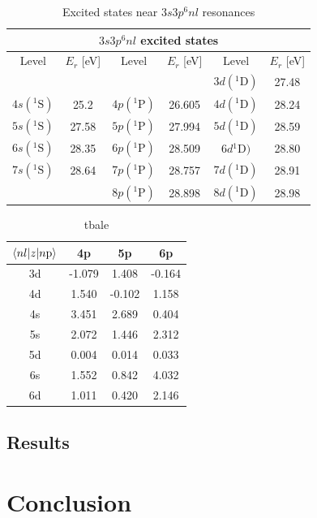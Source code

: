 \begin{table}[]
	\centering
	\begin{tabular}{|cc|cc|cc|}
		\hline \hline
		\multicolumn{6}{|c|}{$3s3p^6nl$ excited states}                                               \\ \hline
		Level        & $E_r$ {[}eV{]} & Level        & $E_r$ {[}eV{]} & Level        & $E_r$ {[}eV{]} \\ \hline
		&                &              &                & $3d({}^1\mathrm{D})$ & 27.48          \\
		$4s( {}^1\mathrm{S})$ & 25.2           & $4p({}^1\mathrm{P})$ & 26.605         & $4d({}^1\mathrm{D})$   & 28.24          \\
		$5s( {}^1\mathrm{S})$ & 27.58          & $5p({}^1\mathrm{P})$ & 27.994         & $5d({}^1\mathrm{D})$ & 28.59          \\
		$6s( {}^1\mathrm{S})$ & 28.35          & $6p({}^1\mathrm{P})$ & 28.509         & $6d{}^1\mathrm{D})$ & 28.80          \\
		$7s( {}^1\mathrm{S})$ & 28.64          & $7p({}^1\mathrm{P})$ & 28.757         & $7d({}^1\mathrm{D})$   & 28.91          \\
		&                & $8p({}^1\mathrm{P})$ & 28.898         & $8d({}^1\mathrm{D})$ & 28.98          \\ \hline \hline
	\end{tabular}
	\caption{Excited states near $3s3p^6nl$ resonances}
	\label{tab:all_states}
\end{table}

\begin{table}[]
	\centering
	\begin{tabular}{cccc}
		\toprule
		$\braket{nl|z|n\mathrm{p}}$ &     4p &     5p &     6p \\
		\midrule
		3d & -1.079 &  1.408 & -0.164 \\
		4d &  1.540 & -0.102 &  1.158 \\
		4s &  3.451 &  2.689 &  0.404 \\
		5s &  2.072 &  1.446 &  2.312 \\
		5d &  0.004 &  0.014 &  0.033 \\
		6s &  1.552 &  0.842 &  4.032 \\
		6d &  1.011 &  0.420 &  2.146 \\
		\bottomrule
	\end{tabular}
	\caption{tbale}
	\label{tab:matrix_elements}
\end{table}


\subsection{Results}
\label{sec:ATS_ar_results}

\section{Conclusion}
\label{sec:ATS_conclusion}

